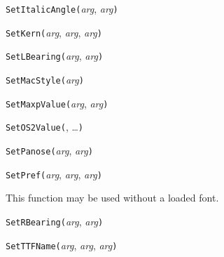 

\texttt{SetItalicAngle(}\textit{arg}, \textit{arg}\texttt{)}



\texttt{SetKern(}\textit{arg}, \textit{arg}, \textit{arg}\texttt{)}



\texttt{SetLBearing(}\textit{arg}, \textit{arg}\texttt{)}



\texttt{SetMacStyle(}\textit{arg}\texttt{)}



\texttt{SetMaxpValue(}\textit{arg}, \textit{arg}\texttt{)}



\texttt{SetOS2Value(}, \ldots\texttt{)}



\texttt{SetPanose(}\textit{arg}, \textit{arg}\texttt{)}



\texttt{SetPref(}\textit{arg}, \textit{arg}, \textit{arg}\texttt{)}

This function may be used without a loaded font.



\texttt{SetRBearing(}\textit{arg}, \textit{arg}\texttt{)}



\texttt{SetTTFName(}\textit{arg}, \textit{arg}, \textit{arg}\texttt{)}




